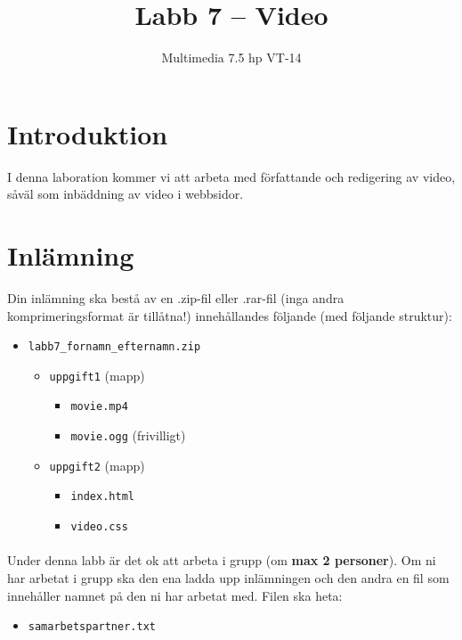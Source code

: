 \documentclass[12pt]{article}
\date{}
\title{ Labb 7 -- Video }
\author{ Multimedia 7.5 hp VT-14 }
\begin{document}
\maketitle
\vspace{-3.5em}




\section{Introduktion}
I denna laboration kommer vi att arbeta med författande och redigering av video, såväl som inbäddning av video i webbsidor.

\section{Inlämning}
Din inlämning ska bestå av en .zip-fil eller .rar-fil (inga andra komprimeringsformat är tillåtna!) innehållandes följande (med följande struktur):
  \begin{itemize}
    \item \texttt{labb7\_fornamn\_efternamn.zip}
      \vspace{-0.5em}
      \begin{itemize}
        \item \texttt{uppgift1} (mapp)
          \begin{itemize}
            \item \texttt{movie.mp4}
            \item \texttt{movie.ogg} (frivilligt)
          \end{itemize}
        \item \texttt{uppgift2} (mapp)
          \begin{itemize}
            \item \texttt{index.html}
            \item \texttt{video.css}
          \end{itemize}
    \end{itemize}
  \end{itemize}
  \paragraph{}
  Under denna labb är det ok att arbeta i grupp (om \textbf{max 2 personer}). Om ni har arbetat i grupp ska den ena ladda upp inlämningen och den andra en fil som innehåller namnet på den ni har arbetat med. Filen ska heta:
  \begin{itemize}
    \item \texttt{samarbetspartner.txt}
  \end{itemize}
\end{document}
